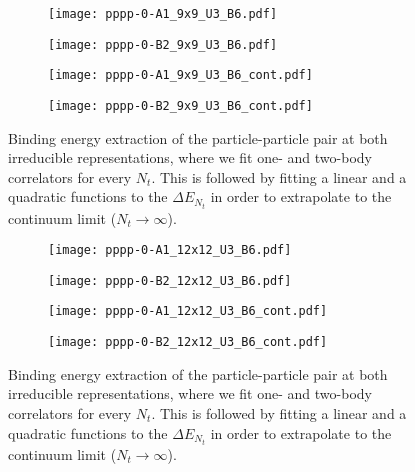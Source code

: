 \begin{figure}
  \begin{subfigure}{.5\textwidth}
    \centering
    \texttt{[image: pppp-0-A1\_9x9\_U3\_B6.pdf]}
  \end{subfigure}%
  \begin{subfigure}{.5\textwidth}
    \centering
    \texttt{[image: pppp-0-B2\_9x9\_U3\_B6.pdf]}
  \end{subfigure}
  \begin{subfigure}{.5\textwidth}
      \centering
      \texttt{[image: pppp-0-A1\_9x9\_U3\_B6\_cont.pdf]}
  \end{subfigure}
  \begin{subfigure}{.5\textwidth}
      \centering
      \texttt{[image: pppp-0-B2\_9x9\_U3\_B6\_cont.pdf]}
  \end{subfigure}
  \caption{Binding energy extraction of the particle-particle pair at both irreducible representations, where we fit one- and two-body correlators for every $N_t$. This is followed by fitting a linear and a quadratic functions to the $\Delta E_{N_t}$ in order to extrapolate to the continuum limit ($N_t\to\infty$).}
  \label{fig:fig7}
\end{figure}

\begin{figure}
  \begin{subfigure}{.5\textwidth}
    \centering
    \texttt{[image: pppp-0-A1\_12x12\_U3\_B6.pdf]}
  \end{subfigure}%
  \begin{subfigure}{.5\textwidth}
    \centering
    \texttt{[image: pppp-0-B2\_12x12\_U3\_B6.pdf]}
  \end{subfigure}
  \begin{subfigure}{.5\textwidth}
      \centering
      \texttt{[image: pppp-0-A1\_12x12\_U3\_B6\_cont.pdf]}
  \end{subfigure}
  \begin{subfigure}{.5\textwidth}
      \centering
      \texttt{[image: pppp-0-B2\_12x12\_U3\_B6\_cont.pdf]}
  \end{subfigure}
  \caption{Binding energy extraction of the particle-particle pair at both irreducible representations, where we fit one- and two-body correlators for every $N_t$. This is followed by fitting a linear and a quadratic functions to the $\Delta E_{N_t}$ in order to extrapolate to the continuum limit ($N_t\to\infty$).}
  \label{fig:fig8}
\end{figure}

